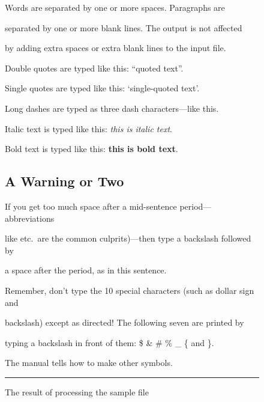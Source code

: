 \begin{figure}
Words are separated by one or    more      spaces.  Paragraphs are

    separated by one or more blank lines.  The output is not affected

by adding extra spaces or extra blank lines to the input file.





Double quotes are typed like this: ``quoted text''.

Single quotes are typed like this: `single-quoted text'.



Long dashes are typed as three dash characters---like this.



Italic text is typed like this: {\em this is italic text}.

Bold   text is typed like this: {\bf this is  bold  text}.



\subsection{A Warning or Two}        %



If you get too much space after a mid-sentence period---abbreviations

like etc.\ are the common culprits)---then type a backslash followed by

a space after the period, as in this sentence.



Remember, don't type the 10 special characters (such as dollar sign and

backslash) except as directed!  The following seven are printed by

typing a backslash in front of them:  \$  \&  \#  \%  \_  \{  and  \}.

The manual tells how to make other symbols.




% 




\noindent\rule{\textwidth}{0.8pt}



\setcounter{section}{\value{savesection}}

\setcounter{subsection}{\value{savesubsection}}



\caption{The result of processing the sample file}\label{fig:result}



\end{figure} %



